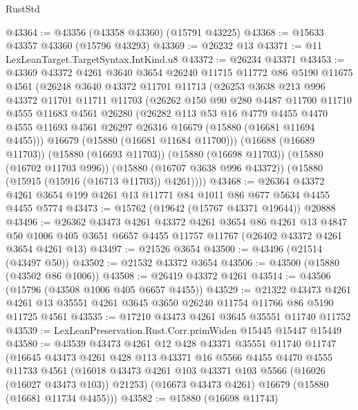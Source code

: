 \begin{lexlean}{RustStd}
\begin{coremodule}
@43364 := @43356 (@43358 @43360) (@15791 @43225)
@43368 := @15633 @43357 @43360 (@15796 @43293)
@43369 := @26232 @13
@43371 := @11 LexLeanTarget.TargetSyntax.IntKind.u8
@43372 := @26234 @43371
@43453 := @43369
    @43372
    @4261
    @3640
    @3654
    @26240
    @11715
    @11772
    @86
    @5190
    @11675
    @4561
    (@26248
      @3640
      @43372
      @11701
      @11713
      (@26253
        @3638
        @213
        @996
        @43372
        @11701
        @11711
        @11703
        (@26262
          @150
          @90
          @280
          @4487
          @11700
          @11710
          @4555
          @11683
          @4561
          @26280
          (@26282
            @113
            @53
            @16
            @4779
            @4455
            @4470
            @4555
            @11693
            @4561
            @26297
            @26316
            @16679
            (@15880 (@16681 @11694 @4455)))
          @16679
          (@15880 (@16681 @11684 @11700)))
        (@16688 (@16689 @11703))
        (@15880 (@16693 @11703))
        (@15880 (@16698 @11703))
        (@15880 (@16702 @11703 @996))
        (@15880 (@16707 @3638 @996 @43372))
        (@15880 (@15915 (@15916 (@16713 @11703)) @4261))))
@43468 := @26364 @43372 @4261 @3654 @199 @4261 @13 @11771 @84 @1011 @86 @677 @5634 @4455 @4455 @5774
@43473 := @15762 (@19642 (@15767 @43371 @19644)) @20888
@43496 := @26362
    @43473
    @4261
    @43372
    @4261
    @3654
    @86
    @4261
    @13
    @4847
    @50
    @1006
    @405
    @3651
    @6657
    @4455
    @11757
    @11767
    (@26402 @43372 @4261 @3654 @4261 @13)
@43497 := @21526 @3654
@43500 := @43496 (@21514 (@43497 @50))
@43502 := @21532 @43372 @3654
@43506 := @43500 (@15880 (@43502 @86 @1006))
@43508 := @26419 @43372 @4261
@43514 := @43506 (@15796 (@43508 @1006 @405 @6657 @4455))
@43529 := @21322
    @43473
    @4261
    @4261
    @13
    @35551
    @4261
    @3645
    @3650
    @26240
    @11754
    @11766
    @86
    @5190
    @11725
    @4561
@43535 := @17210 @43473 @4261 @3645 @35551 @11740 @11752
@43539 := LexLeanPreservation.Rust.Corr.primWiden @15445 @15447 @15449
@43580 := @43539
    @43473
    @4261
    @12
    @428
    @43371
    @35551
    @11740
    @11747
    (@16645
      @43473
      @4261
      @428
      @113
      @43371
      @16
      @5566
      @4455
      @4470
      @4555
      @11733
      @4561
      (@16018 @43473 @4261 @103 @43371 @103 @5566 (@16026 (@16027 @43473 @103)) @21253)
      (@16673 @43473 @4261)
      @16679
      (@15880 (@16681 @11734 @4455)))
@43582 := @15880 (@16698 @11743)

\end{coremodule}
\end{lexlean}
